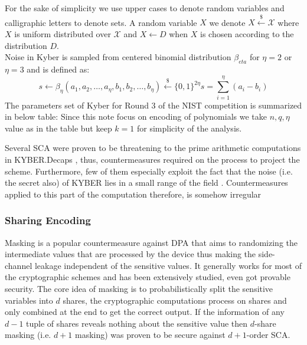 \documentclass{llncs}
\begin{document}
For the sake of simplicity we use upper cases to denote random variables and calligraphic letters to denote sets.
A random variable $X$ we denote $X \overset{\$}{\leftarrow} \mathcal{X}$ where $X$ is uniform distributed over $\mathcal{X}$ and $X \leftarrow D$ when $X$ is chosen according to the distribution $D$.\\
Noise in Kyber is sampled from centered binomial distribution $\beta_{eta}$ for $\eta=2$ or $\eta=3$ and is defined as:
$$
s \leftarrow \beta_{\eta}
(a_1, a_2, \dots, a_{\eta}, b_1, b_2, \dots, b_{\eta}) \overset{\$}{\leftarrow} \{0, 1\}^{2\eta}
s = \sum_{i=1}^{\eta}(a_i-b_i)
$$
The parameters set of Kyber for Round 3 of the NIST competition is summarized in below table:
Since this note focus on encoding of polynomials we take $n, q, \eta$ value as in the table but keep $k=1$ for simplicity of the analysis.

Several SCA were proven to be threatening to the prime arithmetic computations in KYBER.Decaps , thus, countermeasures required on the process to project the scheme. Furthermore, few of them especially exploit the fact that the noise (i.e. the secret also) of KYBER lies in a small range of the field . Countermeasures applied to this part of the computation therefore, is somehow irregular  



\subsubsection*{Sharing Encoding}


Masking is a popular countermeasure against DPA that aims to randomizing the intermediate values that are processed by the device thus making the side-channel leakage independent of the sensitive values. It generally works for most of the cryptographic schemes and has been extensively studied, even got provable security. The core idea of masking is to probabilistically split the sensitive variables into $d$ shares, the cryptographic computations process on shares and only combined at the end to get the correct output. If the information of any $d-1$ tuple of shares reveals nothing about the sensitive value then $d$-share masking (i.e. $d+1$ masking) was proven to be secure against $d+1$-order SCA.
\end{document}
